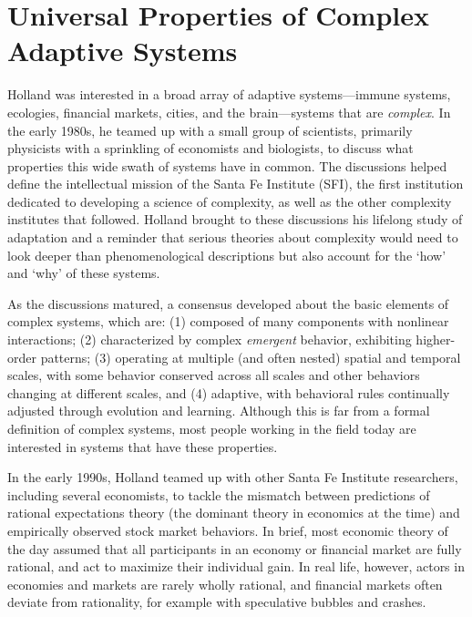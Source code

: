 \documentclass{sig-alternate}
\begin{document}
\section{Universal Properties of Complex Adaptive Systems}

Holland was interested in a broad array of adaptive systems---immune
systems, ecologies, financial markets, cities, and the brain---systems
that are \emph{complex}.  In the early 1980s, he teamed up with a small
group of scientists, primarily physicists with a sprinkling of
economists and biologists, to discuss what properties this wide swath of systems
have in common.  The discussions helped define the intellectual mission
of the Santa Fe Institute (SFI), the first institution dedicated to
developing a science of complexity, as well as the other complexity institutes that followed.
Holland brought to these discussions his lifelong study of
adaptation and a reminder that serious theories about complexity would
need to look deeper than phenomenological descriptions but also
account for the `how' and `why' of these systems.

As the discussions matured, a consensus developed about the basic
elements of complex systems, which are: (1) 
composed of many
components with nonlinear interactions; (2) 
characterized by complex \emph{emergent} behavior, exhibiting
higher-order patterns; (3) 
operating at multiple (and often
nested) spatial and temporal scales, with some behavior 
conserved across all scales and other behaviors changing at different
scales, and (4) 
adaptive, with 
behavioral rules continually adjusted through evolution and learning.  Although this
is far from a formal definition of complex systems, most people
working in the field today are interested in systems that have these
properties.


In the early 1990s, Holland teamed up with other Santa Fe Institute researchers,
including several economists, to tackle the mismatch between predictions
of rational expectations theory (the dominant theory in economics at the time) 
and empirically observed stock market behaviors. 
In brief, most
economic theory of the day assumed that all participants in an economy
or financial market are fully rational, and act to maximize their
individual gain.  In real life, however, actors in economies
and markets are rarely wholly rational, and financial markets often deviate
from rationality, for example with speculative bubbles and crashes.
\end{document}
